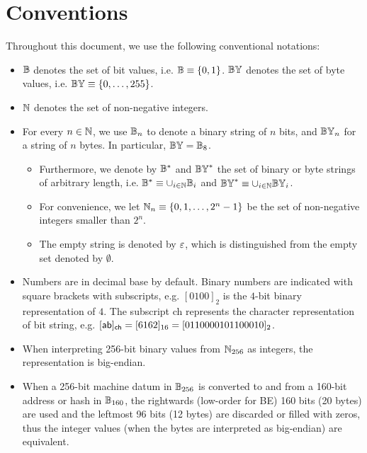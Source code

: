 
\section{Conventions}

Throughout this document, we use the following conventional notations:  
\begin{itemize}[nosep]
	\item $\mathbb{B}$ denotes the set of bit values, i.e. $\mathbb{B}\equiv  \{ 0, 1 \} $. 
	$\mathbb{BY}$ denotes the set of byte values, i.e. $\mathbb{BY}\equiv {\left \{{0,\dots,255} \right \}}$.

	\item $\mathbb{N}$ denotes the set of non-negative integers.


	\item For every $n\in \mathbb{N}$, we use $\mathbb{B}_n$ to denote a binary string of $n$ bits, and $\mathbb{BY}_n$ for a string of $n$ bytes. In particular, $\mathbb{BY}=\mathbb{B}_8$.
	
	\begin{itemize}
		\item Furthermore, we denote by $\mathbb{B}^*$ and $\mathbb{BY}^*$ the set of binary or byte strings of arbitrary length, i.e. $\mathbb{B}^*\equiv \cup_{i\in\mathbb{N}} \mathbb{B}_i$ and $\mathbb{BY}^*\equiv \cup_{i\in\mathbb{N}} \mathbb{BY}_i$. 
	
		\item For convenience, we let $\mathbb{N}_{n}\equiv{\left \{{0,1,\dots, 2^n-1} \right \}}$  be the set of non-negative integers smaller than $2^n$.

		\item The empty string is denoted by $\mathbb{\varepsilon}$, which is distinguished from the empty set denoted by $\emptyset$.
	\end{itemize}

	\item Numbers are in decimal base by default. Binary numbers are indicated with square brackets with subscripts, e.g. $[0100]_2$ is the $4$-bit binary representation of $4$. The subscript \textsf{ch} represents the character representation of bit string, e.g. $[{\sf ab}]_{\sf ch}=[6162]_{16}=[0110000101100010]_2$.

	\item When interpreting 256-bit binary values from $\mathbb{N}_{256}$ as integers, the representation is big-endian.

	\item When a 256-bit machine datum in $\mathbb{B}_{256}$ is converted to and from a 160-bit address or hash in $\mathbb{B}_{160}$, the rightwards (low-order for BE) 160 bits (20 bytes) are used and the leftmost 96 bits (12 bytes) are discarded or filled with zeros, thus the integer values (when the bytes are interpreted as big-endian) are equivalent.


\end{itemize}
